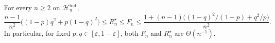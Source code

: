 For every \(n\ge2\) on \(\mathcal H_n^{\mathrm{hub}}\),
\[
 \frac{n-1}{n^2}\bigl((1-p)q^2+p(1-q)^2\bigr)
 \le R_n^{\star}\le F_n
 \le \frac{1+(n-1)\bigl((1-q)^2/(1-p)+q^2/p\bigr)}{n^2}.
\]
In particular, for fixed \(p,q\in[\varepsilon,1-\varepsilon]\), both \(F_n\) and \(R_n^{\star}\) are \(\Theta(n^{-1})\).